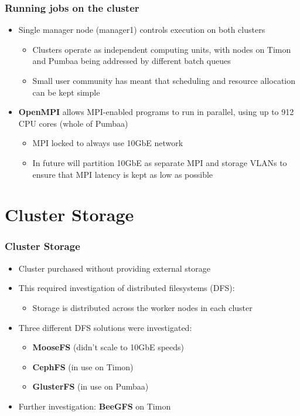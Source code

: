 \documentclass[handout]{beamer}
\begin{document}
\begin{frame}
\frametitle{Running jobs on the cluster}
\begin{itemize}
\item Single manager node (manager1) controls execution on both clusters
\begin{itemize}
\item Clusters operate as independent computing units, with nodes on Timon and Pumbaa being addressed by different batch queues
\item Small user community has meant that scheduling and resource allocation can be kept simple
\end{itemize}
\item \textbf{OpenMPI} allows MPI-enabled programs to run in parallel, using up to 912 CPU cores (whole of Pumbaa)
\begin{itemize}
\item MPI locked to always use 10GbE network
\item In future will partition 10GbE as separate MPI and storage VLANs to ensure that MPI latency is kept as low as possible
\end{itemize}
\end{itemize}
\end{frame}

\section{Cluster Storage}

\begin{frame}
\frametitle{Cluster Storage}
\begin{itemize}
\item Cluster purchased without providing external storage
\item This required investigation of distributed filesystems (DFS):
\begin{itemize}
\item Storage is distributed across the worker nodes in each cluster
\end{itemize}
\item Three different DFS solutions were investigated:
\begin{itemize}
\item \textbf{MooseFS} (didn't scale to 10GbE speeds)
\item \textbf{CephFS} (in use on Timon)
\item \textbf{GlusterFS} (in use on Pumbaa)
\end{itemize}
\item Further investigation: \textbf{BeeGFS} on Timon
\end{itemize}
\end{frame}
\end{document}
